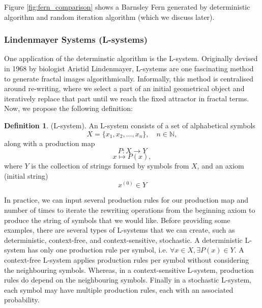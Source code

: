 \documentclass[a4paper,11pt, titlepage]{article}
\theoremstyle{definition}
\newtheorem{definition}{Definition}[section]
\theoremstyle{plain}
\theoremstyle{remark}
\theoremstyle{definition}
\begin{document}
Figure \ref{fig:fern_comparison} shows a Barnsley Fern generated by deterministic algorithm and random iteration algorithm (which we discuss later).

\subsubsection{Lindenmayer Systems (L-systems)}
One application of the determinstic algorithm is the L-system. Originally devised in 1968 by biologist Aristid Lindenmayer, L-systems are one fascinating method to generate fractal images algorithmically. Informally, this method is centralised around re-writing, where we select a part of an initial geometrical object and iteratively replace that part until we reach the fixed attractor in fractal terms. Now, we propose the following definition:

\begin{definition}
(L-system)\cite{lok2017educationmath}. An L-system consists of a set of alphabetical symbols
\[
X = \{x_{1}, x_{2}, ..., x_{n}\}, \quad n \in \mathbb{N},
\]
along with a production map
\[ P : X \to Y \]
\[ x \mapsto P(x), \]
where \( Y \) is the collection of strings formed by symbols from \( X \), and an axiom (initial string)
\[ x^{(0)} \in Y\]
\end{definition}

In practice, we can input several production rules for our production map and number of times to iterate the rewriting operations from the beginning axiom to produce the string of symbols that we would like. Before providing some examples, there are several types of L-systems that we can create, such as deterministic, context-free, and context-sensitive, stochastic. A deterministic L-system has only one production rule per symbol, i.e. \(\forall x \in X, \exists P(x) \in Y\). A context-free L-system applies production rules per symbol without considering the neighbouring symbols. Whereas, in a context-sensitive L-system, production rules do depend on the neighbouring symbols. Finally in a stochastic L-system, each symbol may have multiple production rules, each with an associated probability.
\end{document}

